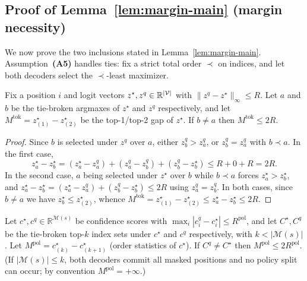 \subsection{Proof of Lemma~\ref{lem:margin-main} (margin necessity)}
\label{app:proofs:margins}

We now prove the two inclusions stated in Lemma~\ref{lem:margin-main}. Assumption~\textbf{(A5)} handles ties: fix a strict total order $\prec$ on indices, and let both decoders select
the $\prec$-least maximizer.

\begin{lemma}
\label{lem:G:tokmargin}
Fix a position $i$ and logit vectors $z^{\star},z^{q}\in\mathbb{R}^{|\mathcal{V}|}$ with
$\|z^{q}-z^{\star}\|_{\infty}\le R$. Let $a$ and $b$ be the tie-broken argmaxes of $z^{\star}$ and
$z^{q}$ respectively, and let
$M^{\mathrm{tok}}=z^{\star}_{(1)}-z^{\star}_{(2)}$ be the top-1/top-2 gap of $z^{\star}$. If
$b\neq a$ then $M^{\mathrm{tok}}\le2R$.
\end{lemma}

\begin{proof}
Since $b$ is selected under $z^{q}$ over $a$, either $z^{q}_{b}>z^{q}_{a}$, or
$z^{q}_{b}=z^{q}_{a}$ with $b\prec a$. In the first case,
\[
z^{\star}_{a}-z^{\star}_{b}
=(z^{\star}_{a}-z^{q}_{a})+(z^{q}_{a}-z^{q}_{b})+(z^{q}_{b}-z^{\star}_{b})
\le R+0+R=2R .
\]
In the second case, $a$ being selected under $z^{\star}$ over $b$ while $b\prec a$ forces
$z^{\star}_{a}>z^{\star}_{b}$, and
$z^{\star}_{a}-z^{\star}_{b}
=(z^{\star}_{a}-z^{q}_{a})+(z^{q}_{b}-z^{\star}_{b})\le2R$
using $z^{q}_{a}=z^{q}_{b}$. In both cases, since $b\neq a$ we have
$z^{\star}_{b}\le z^{\star}_{(2)}$, whence
$M^{\mathrm{tok}}=z^{\star}_{(1)}-z^{\star}_{(2)}\le z^{\star}_{a}-z^{\star}_{b}\le2R$.
\end{proof}

\begin{lemma}
\label{lem:G:polmargin}
Let $c^{\star},c^{q}\in\mathbb{R}^{\mathcal{M}(s)}$ be confidence scores with
$\max_{i}|c^{q}_{i}-c^{\star}_{i}|\le R^{\mathrm{pol}}$, and let $C^{\star},C^{q}$ be the
tie-broken top-$k$ index sets under $c^{\star}$ and $c^{q}$ respectively, with
$k<|\mathcal{M}(s)|$. Let
$M^{\mathrm{pol}}=c^{\star}_{(k)}-c^{\star}_{(k+1)}$ (order statistics of $c^{\star}$). If
$C^{q}\neq C^{\star}$ then $M^{\mathrm{pol}}\le2R^{\mathrm{pol}}$. (If $|\mathcal{M}(s)|\le k$,
both decoders commit all masked positions and no policy split can occur; by convention
$M^{\mathrm{pol}}=+\infty$.)
\end{lemma}

